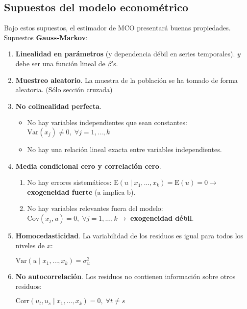 \documentclass[10pt, a4paper, landscape]{article}
\newcommand{\E}{\mathrm{E}}
\newcommand{\Var}{\mathrm{Var}}
\newcommand{\Cov}{\mathrm{Cov}}
\newcommand{\Corr}{\mathrm{Corr}}
\begin{document}
\begin{multicols}{3}
		\subsection*{Supuestos del modelo econométrico}
		
		Bajo estos supuestos, el estimador de MCO presentará buenas propiedades. Supuestos \textbf{Gauss-Markov}:
		
		\begin{enumerate}[leftmargin=*]
			\item \textbf{Linealidad en parámetros} (y dependencia débil en series temporales). $y$ debe ser una función lineal de $\beta$'s.
			\item \textbf{Muestreo aleatorio}. La muestra de la población se ha tomado de forma aleatoria. (Sólo sección cruzada)
			\item \textbf{No colinealidad perfecta}.
			
			\begin{itemize}[leftmargin=*]
				\item No hay variables independientes que sean constantes: $\Var(x_{j}) \neq 0, \; \forall j = 1, \ldots, k$
				\item No hay una relación lineal exacta entre variables independientes.
			\end{itemize}
			
			\item \textbf{Media condicional cero y correlación cero}.
			
			\begin{enumerate}[leftmargin=*, label=\alph{*}.]
				\item No hay errores sistemáticos: $\E(u \mid x_{1}, \ldots, x_{k}) = \E(u) = 0 \rightarrow$ \textbf{exogeneidad fuerte} (a implica b).
				\item No hay variables relevantes fuera del modelo: $\Cov(x_{j}, u) = 0, \; \forall j = 1, \ldots, k \rightarrow$ \textbf{exogeneidad débil}.
			\end{enumerate}
			
			\item \textbf{Homocedasticidad}. La variabilidad de los residuos es igual para todos los niveles de $x$:
			
			$\Var(u \mid x_{1}, \ldots, x_{k}) = \sigma^{2}_{u}$
			
			\item \textbf{No autocorrelación}. Los residuos no contienen información sobre otros residuos:
			
			$\Corr(u_{t}, u_{s} \mid x_{1}, \ldots, x_{k}) = 0, \; \forall t \neq s$
			

\end{enumerate}
\end{multicols}
\end{document}
